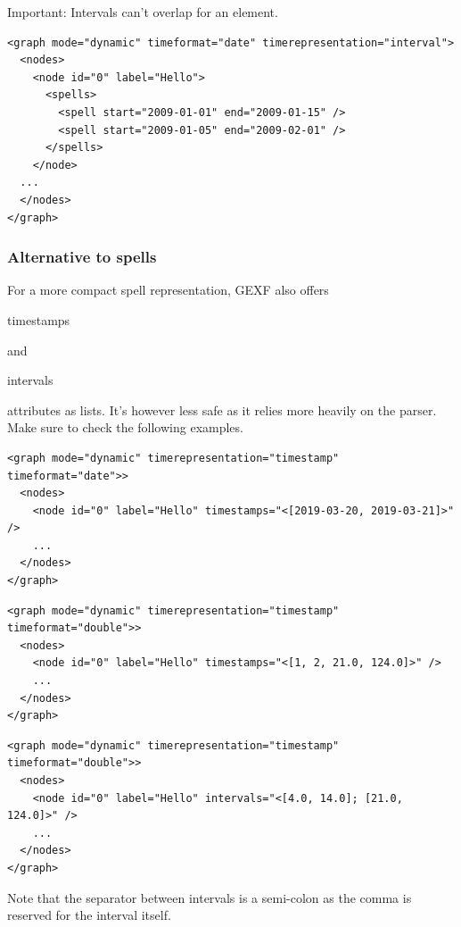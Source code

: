 \documentclass[a4paper,10pt]{article}
\begin{document}
Important: Intervals can't overlap for an element.

\lstset{ style=gexf }
\begin{lstlisting}[caption={Overlapping intervals (not allowed)}]
<graph mode="dynamic" timeformat="date" timerepresentation="interval">
  <nodes>
    <node id="0" label="Hello">
      <spells>
        <spell start="2009-01-01" end="2009-01-15" />
        <spell start="2009-01-05" end="2009-02-01" />
      </spells>
    </node>
  ...
  </nodes>
</graph>
\end{lstlisting}

\subsubsection{Alternative to spells}

For a more compact spell representation, GEXF also offers \begin{footnotesize}timestamps\end{footnotesize} and \begin{footnotesize}intervals\end{footnotesize} attributes as lists. It's however less safe as it relies more heavily on the parser. Make sure to check the following examples.

\lstset{ style=gexf }
\begin{lstlisting}[caption={Timestamp list (Date)}]
<graph mode="dynamic" timerepresentation="timestamp" timeformat="date">>
  <nodes>
    <node id="0" label="Hello" timestamps="<[2019-03-20, 2019-03-21]>" />
    ...
  </nodes>
</graph>
\end{lstlisting}

\lstset{ style=gexf }
\begin{lstlisting}[caption={Timestamp list (Double)}]
<graph mode="dynamic" timerepresentation="timestamp" timeformat="double">>
  <nodes>
    <node id="0" label="Hello" timestamps="<[1, 2, 21.0, 124.0]>" />
    ...
  </nodes>
</graph>
\end{lstlisting}

\lstset{ style=gexf }
\begin{lstlisting}[caption={Interval list (Double)}]
<graph mode="dynamic" timerepresentation="timestamp" timeformat="double">>
  <nodes>
    <node id="0" label="Hello" intervals="<[4.0, 14.0]; [21.0, 124.0]>" />
    ...
  </nodes>
</graph>
\end{lstlisting}

Note that the separator between intervals is a semi-colon as the comma is reserved for the interval itself.
\end{document}
